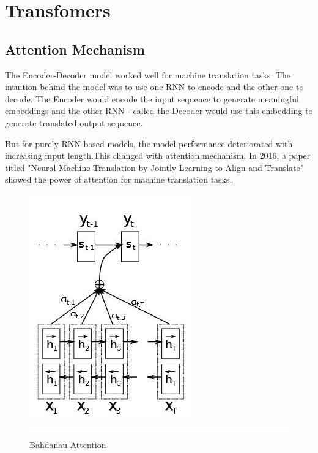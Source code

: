 \section{Transfomers}
\subsection{Attention Mechanism}
The Encoder-Decoder model worked well for machine translation tasks. The intuition behind the model was to use one RNN to encode and the other one to decode. The Encoder would encode the input sequence to generate meaningful embeddings and the other RNN - called the Decoder would use this embedding to generate translated output sequence.

But for purely RNN-based models, the model performance deteriorated with increasing input length.This changed with attention mechanism. In 2016, a paper titled "Neural Machine Translation by Jointly Learning to Align and Translate" \cite{Bahdanau2015NeuralMT} showed the power of attention for machine translation tasks. 
\begin{figure}[htbp]
  \centering
    \includegraphics[scale=0.8]{Figures/bahdanau_attention_figure.JPG}
    \rule{35em}{0.5pt}
  \caption[Bahdanau Attention]{Bahdanau Attention}
  \label{fig:bahdanau_attention}
\end{figure}

